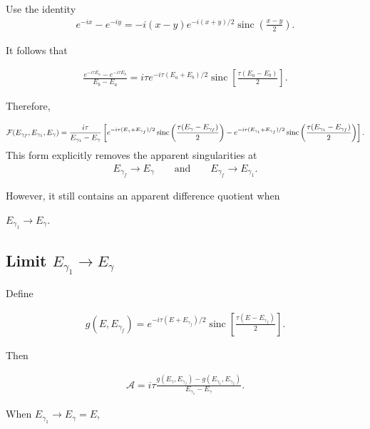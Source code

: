 Use the identity
\begin{align} e^{-ix}-e^{-iy} = -i(x-y)e^{-i(x+y)/2}\operatorname{sinc}\left(\frac{x-y}{2}\right).
\end{align}

It follows that

\begin{align}\frac{e^{-i\tau E_a}-e^{-i\tau E_b}}{E_b-E_a} = i\tau
  e^{-i\tau(E_a+E_b)/2} \operatorname{sinc} \left[
    \frac{\tau(E_a-E_b)}{2}
  \right].
\end{align}

Therefore,
\begin{importantbox}
  \begin{align}
    {\cal F}(E_{\gamma_f},E_{\gamma_1},E_\gamma)
    =
    \frac{i\tau}{E_{\gamma_1}-E_\gamma}
    \left[
      e^{-i\tau(E_\gamma+E_{\gamma_f})/2}
      \operatorname{sinc}
      \left(\frac{\tau(E_\gamma-E_{\gamma_f})}{2}\right)
      -
      e^{-i\tau(E_{\gamma_1}+E_{\gamma_f})/2}
      \operatorname{sinc}
      \left(\frac{\tau(E_{\gamma_1}-E_{\gamma_f})}{2}\right)
    \right].
  \end{align}
  This form explicitly removes the apparent singularities at
  \begin{align} E_{\gamma_f}\to E_\gamma \qquad\text{and}\qquad
    E_{\gamma_f}\to E_{\gamma_1}.
  \end{align}
\end{importantbox}

However, it still contains an apparent difference quotient when

$E_{\gamma_1}\to E_\gamma$.

\subsection{ Limit $E_{\gamma_1}\to E_\gamma$}

Define

\begin{align} g(E, E_{\gamma_f})= e^{-i\tau(E+E_{\gamma_f})/2} \operatorname{sinc}
  \left[
    \frac{\tau(E-E_{\gamma_f})}{2}
  \right].
\end{align}

Then

\begin{align}\mathcal A = i\tau
  \frac{g(E_\gamma, E_{\gamma_f})-g(E_{\gamma_1},E_{\gamma_f})}{E_{\gamma_1}-E_\gamma}.
\end{align}

When $E_{\gamma_1}\to E_\gamma=E$,

